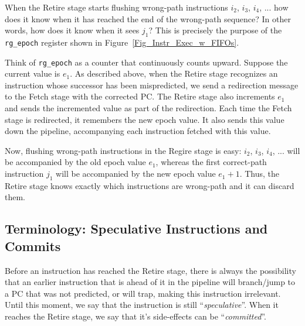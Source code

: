 
When the Retire stage starts flushing wrong-path instructions $i_2$,
$i_3$, $i_4$, ... how does it know when it has reached the end of the
wrong-path sequence?  In other words, how does it know when it sees
$j_1$?  This is precisely the purpose of the \verb|rg_epoch| register
shown in Figure~\ref{Fig_Instr_Exec_w_FIFOs}.

Think of \verb|rg_epoch| as a counter that continuously counts upward.
Suppose the current value is $e_1$.  As described above, when the
Retire stage recognizes an instruction whose successor has been
mispredicted, we send a redirection message to the Fetch stage with
the corrected PC. The Retire stage also increments $e_1$ and sends the
incremented value as part of the redirection.  Each time the Fetch
stage is redirected, it remembers the new epoch value.  It also sends
this value down the pipeline, accompanying each instruction fetched
with this value.

Now, flushing wrong-path instructions in the Regire stage is easy:
$i_2$, $i_3$, $i_4$, ... will be accompanied by the old epoch value
$e_1$, whereas the first correct-path instruction $j_1$ will be
accompanied by the new epoch value $e_1+1$.  Thus, the Retire stage
knows exactly which instructions are wrong-path and it can discard
them.




\subsection{Terminology: Speculative Instructions and Commits}


Before an instruction has reached the Retire stage, there is always
the possibility that an earlier instruction that is ahead of it in the
pipeline will branch/jump to a PC that was not predicted, or will
trap, making this instruction irrelevant.  Until this moment, we say
that the instruction is still ``\emph{speculative}''.  When it reaches
the Retire stage, we say that it's side-effects can be
``\emph{committed}''.

